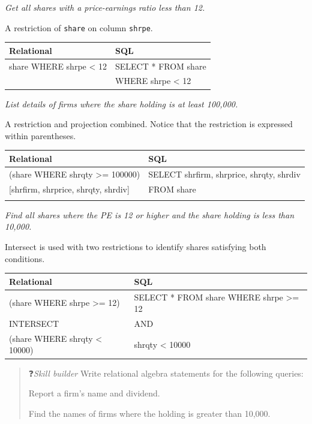 \documentclass[
]{article}
\begin{document}
\emph{Get all shares with a price-earnings ratio less than 12.}

A restriction of \texttt{share} on column \texttt{shrpe}.

\begin{longtable}[]{@{}ll@{}}
\toprule
Relational & SQL \\
\midrule
\endhead
share WHERE shrpe \textless{} 12 & SELECT * FROM share \\
& WHERE shrpe \textless{} 12 \\
\bottomrule
\end{longtable}

\emph{List details of firms where the share holding is at least 100,000.}

A restriction and projection combined. Notice that the restriction is
expressed within parentheses.

\begin{longtable}[]{@{}ll@{}}
\toprule
Relational & SQL \\
\midrule
\endhead
(share WHERE shrqty \textgreater= 100000) & SELECT shrfirm, shrprice, shrqty, shrdiv \\
{[}shrfirm, shrprice, shrqty, shrdiv{]} & FROM share \\
& \\
\bottomrule
\end{longtable}

\emph{Find all shares where the PE is 12 or higher and the share holding is
less than 10,000.}

Intersect is used with two restrictions to identify shares satisfying
both conditions.

\begin{longtable}[]{@{}ll@{}}
\toprule
Relational & SQL \\
\midrule
\endhead
(share WHERE shrpe \textgreater= 12) & SELECT * FROM share WHERE shrpe \textgreater= 12 \\
INTERSECT & AND \\
(share WHERE shrqty \textless{} 10000) & shrqty \textless{} 10000 \\
\bottomrule
\end{longtable}

\begin{quote}
❓\emph{Skill builder} Write relational algebra statements for the following
queries:

Report a firm's name and dividend.

Find the names of firms where the holding is greater than 10,000.
\end{quote}
\end{document}
